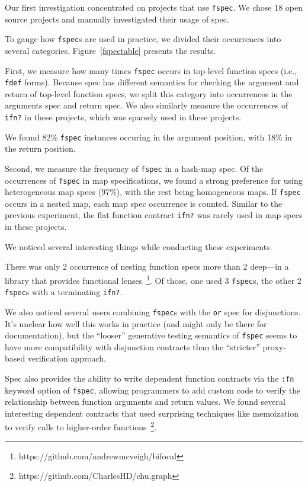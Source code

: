 Our first investigation concentrated on projects that use \texttt{fspec}.
We chose 18 open source projects and manually investigated their usage of spec.

To gauge how \texttt{fspec}s are used in practice, we divided their occurrences
into several categories. 
Figure~\ref{fspectable} presents the results.

First, we measure how many times \texttt{fspec} occurs in top-level function
specs (i.e., \texttt{fdef} forms). Because spec has different semantics for
checking the argument and return of top-level function specs, we split this
category into occurrences in the arguments spec and return spec.
We also similarly measure the occurrences of \texttt{ifn?} in these projects,
which was sparsely used in these projects.

We found 82\% \texttt{fspec} instances occuring in the argument position,
with 18\% in the return position.

Second, we measure the frequency of \texttt{fspec} in a hash-map spec.
Of the occurrences of \texttt{fspec} in map specifications, 
we found a strong preference for using heterogeneous map specs (97\%),
with the rest being homogeneous maps.
If \texttt{fspec} occurs in a nested map, each map spec occurrence is counted.
Similar to the previous experiment, the flat function contract \texttt{ifn?} was rarely used 
in map specs in these projects.

We noticed several interesting things while conducting these experiments.

There was only 2 occurrence of nesting function specs more than 2 deep---in a library
that provides functional lenses~\footnote{https://github.com/andrewmcveigh/bifocal}.
Of those, one used 3 \texttt{fspec}s, the other 2 \texttt{fspec}s with a terminating \texttt{ifn?}.

We also noticed several users combining \texttt{fspec}s with the \texttt{or} spec
for disjunctions. It's unclear how well this works in practice (and might only be
there for documentation), but the ``looser'' generative testing semantics of \texttt{fspec}
seems to have more compatibility with disjunction contracts than the ``stricter''
proxy-based verification approach.

Spec also provides the ability to write dependent function contracts via the \texttt{:fn}
keyword option of \texttt{fspec}, allowing programmers
to add custom code to verify the relationship between function arguments and return values.
We found several interesting dependent contracts that used surprising techniques like
memoization to verify calls to higher-order functions~\footnote{https://github.com/CharlesHD/chu.graph}.

